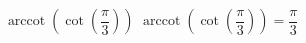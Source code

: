  {$\operatorname{arccot}\left(\cot\left(\dfrac{\pi}{3}\right) \right)$ }
{ $\operatorname{arccot}\left(\cot\left(\dfrac{\pi}{3}\right) \right) = \dfrac{\pi}{3}$ }
